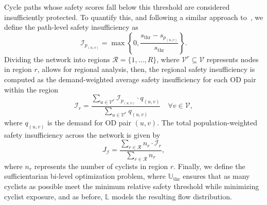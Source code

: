 \documentclass[letterpaper, 10 pt, conference]{ieeeconf}  %
\begin{document}
Cycle paths whose safety scores fall below this threshold are considered insufficiently protected. To quantify this, and following a similar approach to~\cite{salazar2024accessibility}, we define the path-level safety insufficiency as
\begin{equation}
    \mathcal{I}_{p_{(u,v)}} = \max{\left \{0,  \frac{s_{\text{thr}} - s_{p_{(u,v)}}}{s_{\text{thr}}} \right \}}.
\end{equation}
Dividing the network into regions $\mathcal{R} = \{1, \dots, R\}$, where $\mathcal{V}^{r} \subseteq \mathcal{V}$ represents nodes in region $r$, allows for regional analysis, then, the regional safety insufficiency is computed as the demand-weighted average safety insufficiency for each OD pair within the region
\begin{equation}
    \mathcal{I}_{r} = \frac{\sum_{u \in \mathcal{V}^{r}} \mathcal{I}_{p_{(u,v)}} \cdot q_{(u,v)}}{\sum_{u \in \mathcal{V}^{r}} q_{(u,v)}} \quad \forall v \in \mathcal{V},
\end{equation}
where $q_{(u,v)}$ is the demand for OD pair $(u,v)$. The total population-weighted safety insufficiency across the network is given by
\begin{equation}
    J_{\mathcal{I}} = \frac{\sum_{r \in \mathcal{R}} n_{r} \cdot \mathcal{I}_{r}}{\sum_{r \in \mathcal{R}} n_{r}},
\end{equation}
where $n_{r}$ represents the number of cyclists in region $r$. Finally, we define the sufficientarian bi-level optimization problem, where $\mathbb{U}_{\text{thr}}$ ensures that as many cyclists as possible meet the minimum relative safety threshold while minimizing cyclist exposure, and as before, $\mathbb{L}$ models the resulting flow distribution. 
\end{document}
